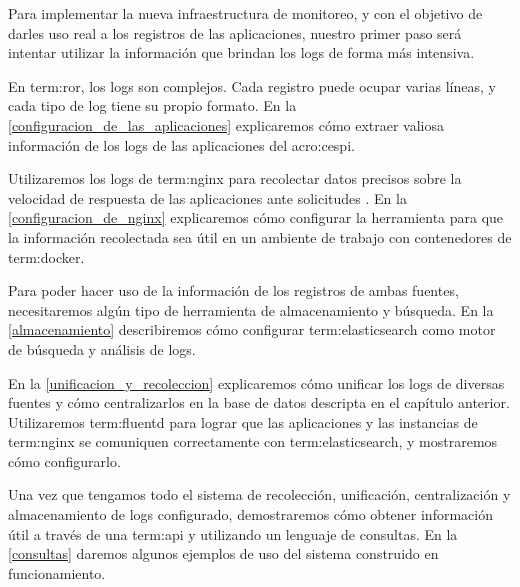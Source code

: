 Para implementar la nueva infraestructura de monitoreo, y con el objetivo de
darles uso real a los registros de las aplicaciones, nuestro primer paso será
intentar utilizar la información que brindan los logs de forma más intensiva.

En \gls{term:ror}, los logs son complejos. Cada registro puede ocupar varias
líneas, y cada tipo de log tiene su propio formato. En la
\autoref{configuracion_de_las_aplicaciones} explicaremos cómo extraer valiosa
información de los logs de las aplicaciones del \gls{acro:cespi}.

Utilizaremos los logs de \gls{term:nginx} para recolectar datos precisos sobre
la velocidad de respuesta de las aplicaciones ante solicitudes . En
la \autoref{configuracion_de_nginx} explicaremos cómo configurar la herramienta
para que la información recolectada sea útil en un ambiente de trabajo con
contenedores de \gls{term:docker}.

Para poder hacer uso de la información de los registros de ambas fuentes,
necesitaremos algún tipo de herramienta de almacenamiento y búsqueda. En la
\autoref{almacenamiento} describiremos cómo configurar \gls{term:elasticsearch}
como motor de búsqueda y análisis de logs.

En la \autoref{unificacion_y_recoleccion} explicaremos cómo unificar los logs
de diversas fuentes y cómo centralizarlos en la base de datos descripta en
el capítulo anterior. Utilizaremos \gls{term:fluentd} para lograr que las
aplicaciones y las instancias de \gls{term:nginx} se comuniquen correctamente
con \gls{term:elasticsearch}, y mostraremos cómo configurarlo.

Una vez que tengamos todo el sistema de recolección, unificación,
centralización y almacenamiento de logs configurado, demostraremos cómo obtener
información útil a través de una \gls{term:api} y utilizando un lenguaje de
consultas. En la \autoref{consultas} daremos algunos ejemplos de uso del
sistema construido en funcionamiento.
